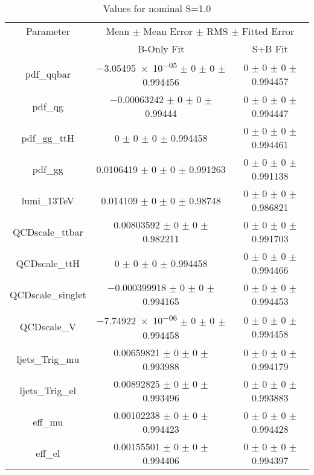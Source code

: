\begin{table}
\centering
\caption{Values for nominal S=1.0}
\begin{tabular}{ccc}
\toprule
Parameter 	& \multicolumn{2}{c}{Mean $\pm$ Mean Error $\pm$ RMS $\pm$ Fitted Error}\\
 	& B-Only Fit & S+B Fit\\
\midrule
pdf\_qqbar 	& \num{-3.05495e-05} $\pm$ \num{0} $\pm$ \num{0} $\pm$ \num{0.994456} 	& \num{0} $\pm$ \num{0} $\pm$ \num{0} $\pm$ \num{0.994457}\\
pdf\_qg 	& \num{-0.00063242} $\pm$ \num{0} $\pm$ \num{0} $\pm$ \num{0.99444} 	& \num{0} $\pm$ \num{0} $\pm$ \num{0} $\pm$ \num{0.994447}\\
pdf\_gg\_ttH 	& \num{0} $\pm$ \num{0} $\pm$ \num{0} $\pm$ \num{0.994458} 	& \num{0} $\pm$ \num{0} $\pm$ \num{0} $\pm$ \num{0.994461}\\
pdf\_gg 	& \num{0.0106419} $\pm$ \num{0} $\pm$ \num{0} $\pm$ \num{0.991263} 	& \num{0} $\pm$ \num{0} $\pm$ \num{0} $\pm$ \num{0.991138}\\
lumi\_13TeV 	& \num{0.014109} $\pm$ \num{0} $\pm$ \num{0} $\pm$ \num{0.98748} 	& \num{0} $\pm$ \num{0} $\pm$ \num{0} $\pm$ \num{0.986821}\\
QCDscale\_ttbar 	& \num{0.00803592} $\pm$ \num{0} $\pm$ \num{0} $\pm$ \num{0.982211} 	& \num{0} $\pm$ \num{0} $\pm$ \num{0} $\pm$ \num{0.991703}\\
QCDscale\_ttH 	& \num{0} $\pm$ \num{0} $\pm$ \num{0} $\pm$ \num{0.994458} 	& \num{0} $\pm$ \num{0} $\pm$ \num{0} $\pm$ \num{0.994466}\\
QCDscale\_singlet 	& \num{-0.000399918} $\pm$ \num{0} $\pm$ \num{0} $\pm$ \num{0.994165} 	& \num{0} $\pm$ \num{0} $\pm$ \num{0} $\pm$ \num{0.994453}\\
QCDscale\_V 	& \num{-7.74922e-06} $\pm$ \num{0} $\pm$ \num{0} $\pm$ \num{0.994458} 	& \num{0} $\pm$ \num{0} $\pm$ \num{0} $\pm$ \num{0.994458}\\
ljets\_Trig\_mu 	& \num{0.00659821} $\pm$ \num{0} $\pm$ \num{0} $\pm$ \num{0.993988} 	& \num{0} $\pm$ \num{0} $\pm$ \num{0} $\pm$ \num{0.994179}\\
ljets\_Trig\_el 	& \num{0.00892825} $\pm$ \num{0} $\pm$ \num{0} $\pm$ \num{0.993496} 	& \num{0} $\pm$ \num{0} $\pm$ \num{0} $\pm$ \num{0.993883}\\
eff\_mu 	& \num{0.00102238} $\pm$ \num{0} $\pm$ \num{0} $\pm$ \num{0.994423} 	& \num{0} $\pm$ \num{0} $\pm$ \num{0} $\pm$ \num{0.994428}\\
eff\_el 	& \num{0.00155501} $\pm$ \num{0} $\pm$ \num{0} $\pm$ \num{0.994406} 	& \num{0} $\pm$ \num{0} $\pm$ \num{0} $\pm$ \num{0.994397}\\

\end{tabular}
\end{table}
